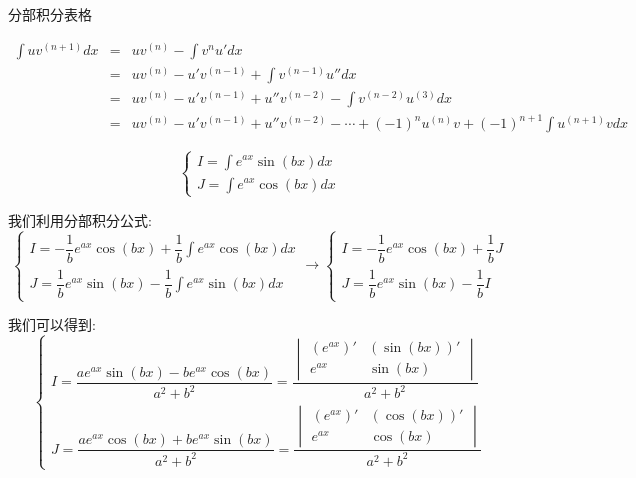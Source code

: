 \begin{table}[ht]
	\centering
	\caption{分部积分表格}
	\label{table: 分部积分表格法}
\end{table}
\begin{theorem}
	\begin{eqnarray*}
		\int uv^{(n+1)}dx &=& uv^{(n)} - \int v^{n}u'dx \\
			              &=& uv^{(n)} - u'v^{(n-1)} + \int v^{(n-1)}u''dx\\
			              &=& uv^{(n)} - u'v^{(n-1)} +  u''v^{(n-2)} -\int v^{(n-2)}u^{(3)}dx\\
			              &=& uv^{(n)} - u'v^{(n-1)} +  u''v^{(n-2)} -\cdots + (-1)^{n}u^{(n)}v + (-1)^{n+1}\int u^{(n+1)}vdx
	\end{eqnarray*}
\end{theorem}
\begin{theorem}[组合积分]
\begin{proposition}
	$$\begin{cases} I = \int e^{ax}\sin (bx)dx\\ J = \int e^{ax} \cos (bx)dx\end{cases}$$
\end{proposition}
\begin{solution}
	
	我们利用分部积分公式:
	$$\begin{cases} I = -\dfrac{1}{b}e^{ax}\cos (bx) + \dfrac{1}{b}\int e^{ax}\cos (bx) dx \\ J = \dfrac{1}{b}e^{ax}\sin (bx) - \dfrac{1}{b}\int e^{ax}\sin (bx) dx  \end{cases}\to 
	\begin{cases} I = -\dfrac{1}{b}e^{ax}\cos (bx) + \dfrac{1}{b}J \\ J = \dfrac{1}{b}e^{ax}\sin (bx) - \dfrac{1}{b}I  \end{cases}
	$$

	我们可以得到:
	$$
	\begin{cases} I = \dfrac{ae^{ax}\sin(bx)-be^{ax}\cos(bx)}{a^{2}+b^{2}} = \dfrac{\begin{vmatrix}(e^{ax})' & (\sin(bx))'\\ e^{ax} & \sin(bx)\end{vmatrix}}{a^{2}+b^{2}}\\ J = \dfrac{ae^{ax}\cos(bx) + be^{ax}\sin(bx)}{a^{2}+b^{2}} = \dfrac{\begin{vmatrix}(e^{ax})' & (\cos(bx))'\\ e^{ax} & \cos(bx)\end{vmatrix}}{a^{2}+b^{2}}   \end{cases}
	$$
\end{solution}
\end{theorem}

